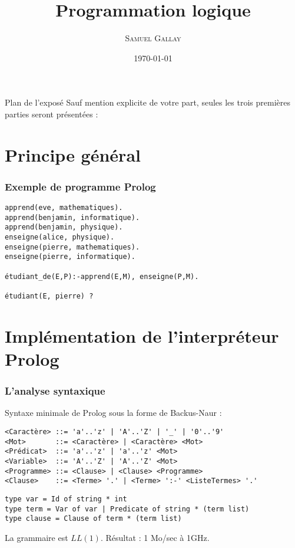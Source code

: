 \documentclass[aspectratio=43]{beamer}
\title{Programmation logique}
\author{\textsc{Samuel Gallay}}
\date{\today}
\begin{document}
\frame{\titlepage}

\begin{frame}{Plan de l'exposé}
Sauf mention explicite de votre part, seules les trois premières parties seront présentées :
  \tableofcontents
\end{frame}

\section{Principe général}

\begin{frame}[fragile]
  \frametitle{Exemple de programme Prolog}
  \begin{verbatim}
apprend(eve, mathematiques).
apprend(benjamin, informatique).
apprend(benjamin, physique).
enseigne(alice, physique).
enseigne(pierre, mathematiques).
enseigne(pierre, informatique).

étudiant_de(E,P):-apprend(E,M), enseigne(P,M).

étudiant(E, pierre) ?
  \end{verbatim}
\end{frame}

\section{Implémentation de l'interpréteur Prolog}

\begin{frame}[fragile]
  \frametitle{L'analyse syntaxique}
  Syntaxe minimale de Prolog sous la forme de Backus-Naur :
  \begin{verbatim}
<Caractère> ::= 'a'..'z' | 'A'..'Z' | '_' | '0'..'9'
<Mot>       ::= <Caractère> | <Caractère> <Mot>
<Prédicat>  ::= 'a'..'z' | 'a'..'z' <Mot>
<Variable>  ::= 'A'..'Z' | 'A'..'Z' <Mot>
<Programme> ::= <Clause> | <Clause> <Programme>
<Clause>    ::= <Terme> '.' | <Terme> ':-' <ListeTermes> '.'
  \end{verbatim}
  
  \vspace{1em}

  \begin{verbatim}
type var = Id of string * int
type term = Var of var | Predicate of string * (term list)
type clause = Clause of term * (term list)
  \end{verbatim}

  \vspace{1em}
  La grammaire est $LL(1)$. Résultat : 1 Mo/sec à 1GHz.
\end{frame}
\end{document}
